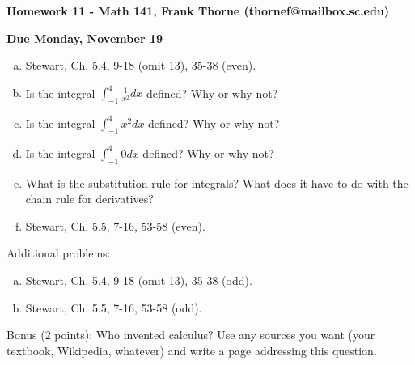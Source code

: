 \documentclass[12pt]{article}
\begin{document}
\setlength{\topmargin}{-2mm}





\begin{center}{\bf Homework 11 - Math 141, Frank Thorne (thornef@mailbox.sc.edu)}
\end{center}
\begin{center}
{\bf Due Monday, November 19}
\end{center}

\begin{enumerate}[(a)]

\item
Stewart, Ch. 5.4, 9-18 (omit 13), 35-38 (even).
\item
Is the integral $\int_{-1}^4 \frac{1}{x^2} dx$ defined? Why or why not?

\item
Is the integral $\int_{-1}^4 x^2 dx$ defined? Why or why not?

\item
Is the integral $\int_{-1}^4 0 dx$ defined? Why or why not?

\item
What is the substitution rule for integrals? What does it have to do with the chain rule
for derivatives?


\item
Stewart, Ch. 5.5, 7-16, 53-58 (even).

\end{enumerate}
Additional problems:

\begin{enumerate}[(a)]

\item
Stewart, Ch. 5.4, 9-18 (omit 13), 35-38 (odd).
\item
Stewart, Ch. 5.5, 7-16, 53-58 (odd).

\end{enumerate}
Bonus (2 points): Who invented calculus? Use any sources you want (your
textbook, Wikipedia, whatever) and write a page addressing this question.
\end{document}
